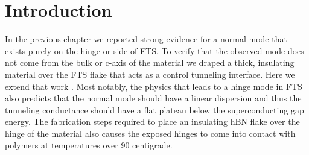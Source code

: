 \section{Introduction}
In the previous chapter we reported strong evidence for a normal mode that exists purely on the hinge or side of \ac{FTS}. To verify that the observed mode does not come from the bulk or c-axis of the material we draped a thick, insulating material over the \ac{FTS} flake that acts as a control tunneling interface. Here we extend that work . Most notably, the physics that leads to a hinge mode in \ac{FTS} also predicts that the normal mode should have a linear dispersion and thus the tunneling conductance should have a flat plateau below the superconducting gap energy\cite{Zhang2019}. The fabrication steps required to place an insulating \ac{hBN} flake over the hinge of the material also causes the exposed hinges to come into contact with polymers at temperatures over 90 centigrade. 

